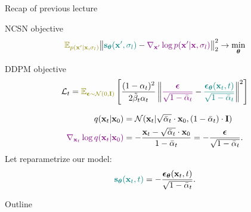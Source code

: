 \begin{frame}{Recap of previous lecture}
	\begin{block}{NCSN objective}
		\vspace{-0.2cm}
		\[
			{\color{olive}\bbE_{p(\bx' | \bx, \sigma_l)}}\bigl\| {\color{teal}\bs_{\btheta}(\bx', \sigma_l)} - {\color{violet}\nabla_{\bx'} \log p(\bx' | \bx, \sigma_l)} \bigr\|^2_2 \rightarrow \min_{\btheta}
		\]
	\end{block}
	\vspace{-0.3cm}
	\begin{block}{DDPM objective}
		\vspace{-0.2cm}
		\[
			\cL_t = {\color{olive}\bbE_{\bepsilon \sim \cN(0, \bI)}} \left[ \frac{(1 - \alpha_t)^2}{2\tilde{\beta}_t \alpha_t} \left\| {\color{violet}\frac{\bepsilon}{\sqrt{1 - \bar{\alpha}_t}}} - {\color{teal}\frac{\bepsilon_{\btheta}(\bx_t, t)}{\sqrt{1 - \bar{\alpha}_t}}}\right\|^2 \right]
		\]
		\vspace{-0.7cm}
	\end{block}
	\begin{align*}
		q(\mathbf{x}_t | \mathbf{x}_0) &= \mathcal{N}(\mathbf{x}_t | \sqrt{\bar{\alpha}_t} \cdot \mathbf{x}_0, (1 - \bar{\alpha}_t) \cdot \mathbf{I}) \\
		{\color{violet}\nabla_{\mathbf{x}_t} \log q(\mathbf{x}_t | \mathbf{x}_0)} &= - \frac{\mathbf{x}_t - \sqrt{\bar{\alpha}_t} \cdot \mathbf{x}_0}{1 - \bar{\alpha}_t} = - \frac{\boldsymbol{\epsilon}}{\sqrt{1 - \bar{\alpha}_t}}.
	\end{align*}
		Let reparametrize our model: 
		\vspace{-0.2cm}
		\[
			{\color{teal}\mathbf{s}_{\boldsymbol{\theta}}(\mathbf{x}_t, t)} = - \frac{\boldsymbol{\epsilon}_{\boldsymbol{\theta}}(\mathbf{x}_t, t)}{\sqrt{1 - \bar{\alpha}_t}}.
		\]
	\end{frame}
\begin{frame}{Outline}
	\tableofcontents
\end{frame}

